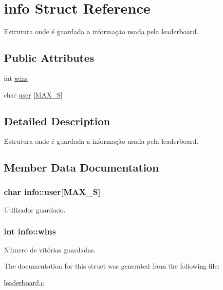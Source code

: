 \hypertarget{structinfo}{\section{info Struct Reference}
\label{structinfo}
}


Estrutura onde é guardada a informação usada pela leaderboard.  


\subsection*{Public Attributes}
\begin{DoxyCompactItemize}
\item 
int \hyperlink{structinfo_a49e18be35314982e0766370359d1ffc7}{wins}
\item 
char \hyperlink{structinfo_a5ebd1a7dd2659a6f2dc02813f223774e}{user} \mbox{[}\hyperlink{leaderboard_8h_ab5c9e28069b9fbddd9c296f14d25b84c}{M\+A\+X\+\_\+\+S}\mbox{]}
\end{DoxyCompactItemize}


\subsection{Detailed Description}
Estrutura onde é guardada a informação usada pela leaderboard. 

\subsection{Member Data Documentation}
\hypertarget{structinfo_a5ebd1a7dd2659a6f2dc02813f223774e}{
\subsubsection[{user}]{\setlength{\rightskip}{0pt plus 5cm}char info\+::user\mbox{[}{\bf M\+A\+X\+\_\+\+S}\mbox{]}}}\label{structinfo_a5ebd1a7dd2659a6f2dc02813f223774e}
Utilizador guardado. \hypertarget{structinfo_a49e18be35314982e0766370359d1ffc7}{
\subsubsection[{wins}]{\setlength{\rightskip}{0pt plus 5cm}int info\+::wins}}\label{structinfo_a49e18be35314982e0766370359d1ffc7}
Número de vitórias guardadas. 

The documentation for this struct was generated from the following file\+:\begin{DoxyCompactItemize}
\item 
\hyperlink{leaderboard_8c}{leaderboard.\+c}\end{DoxyCompactItemize}
